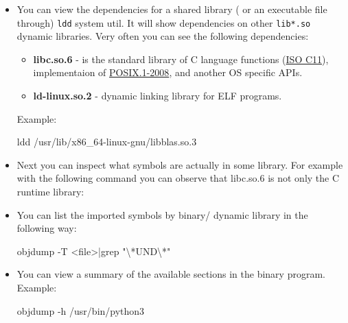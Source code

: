 \documentclass[
]{article}
\newenvironment{Shaded}{}{}
\newcommand{\AttributeTok}[1]{\textcolor[rgb]{0.49,0.56,0.16}{#1}}
\newcommand{\ExtensionTok}[1]{#1}
\newcommand{\FunctionTok}[1]{\textcolor[rgb]{0.02,0.16,0.49}{#1}}
\newcommand{\KeywordTok}[1]{\textcolor[rgb]{0.00,0.44,0.13}{\textbf{#1}}}
\newcommand{\NormalTok}[1]{#1}
\newcommand{\OperatorTok}[1]{\textcolor[rgb]{0.40,0.40,0.40}{#1}}
\newcommand{\StringTok}[1]{\textcolor[rgb]{0.25,0.44,0.63}{#1}}
\begin{document}
\begin{itemize}
\item
  You can view the dependencies for a shared library ( or an executable
  file through) \texttt{ldd} system util. It will show dependencies on
  other \texttt{lib*.so} dynamic libraries. Very often you can see the
  following dependencies:

  \begin{itemize}
  \item
    \textbf{libc.so.6} - is the standard library of C language functions
    (\href{https://www.iso.org/standard/57853.html}{ISO C11}),
    implementaion of
    \href{https://pubs.opengroup.org/onlinepubs/9699919799.2008edition/functions/contents.html}{POSIX.1-2008},
    and another OS specific APIs.
  \item
    \textbf{ld-linux.so.2} - dynamic linking library for ELF programs.
  \end{itemize}

  Example:

\begin{Shaded}
\begin{Highlighting}[]
\FunctionTok{ldd}\NormalTok{ /usr/lib/x86\_64{-}linux{-}gnu/libblas.so.3}
\end{Highlighting}
\end{Shaded}
\item
  Next you can inspect what symbols are actually in some library. For
  example with the following command you can observe that libc.so.6 is
  not only the C runtime library:

\begin{Shaded}
\end{Shaded}
\item
  You can list the imported symbols by binary/ dynamic library in the
  following way:

\begin{Shaded}
\begin{Highlighting}[]
\ExtensionTok{objdump} \AttributeTok{{-}T} \OperatorTok{\textless{}}\NormalTok{file}\OperatorTok{\textgreater{}|}\NormalTok{grep }\StringTok{"\textbackslash{}*UND\textbackslash{}*"}
\end{Highlighting}
\end{Shaded}
\item
  You can view a summary of the available sections in the binary
  program. Example:

\begin{Shaded}
\begin{Highlighting}[]
\ExtensionTok{objdump} \AttributeTok{{-}h}\NormalTok{ /usr/bin/python3}
\end{Highlighting}
\end{Shaded}
\end{itemize}
\end{document}
